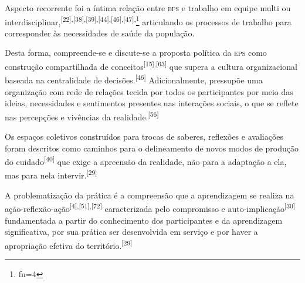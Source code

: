 \documentclass{article}
\makeatletter
\newcommand{\fn}{\afterassignment\fn@aux\count0=}
\newcommand{\fn@aux}{\csname fn\the\count0\endcsname}
\makeatother
\begin{document}
Aspecto recorrente foi a íntima relação entre \textsc{eps} e trabalho em equipe multi ou
interdisciplinar,\textsuperscript{[}\textsuperscript{22}\textsuperscript{]}\textsuperscript{,}\textsuperscript{[}\textsuperscript{38}\textsuperscript{]}\textsuperscript{,}\textsuperscript{[}\textsuperscript{39}\textsuperscript{]}\textsuperscript{,}\textsuperscript{[}\textsuperscript{44}\textsuperscript{]}\textsuperscript{,}\textsuperscript{[}\textsuperscript{46}\textsuperscript{]}\textsuperscript{,}\textsuperscript{[}\textsuperscript{47}\textsuperscript{]}\textsuperscript{,}\footnote{\fn4}
articulando os processos de trabalho para corresponder às necessidades de saúde
da população.

Desta forma, compreende-se e discute-se a proposta política da \textsc{eps} como
construção compartilhada de conceitos\textsuperscript{[}\textsuperscript{15}\textsuperscript{]}\textsuperscript{,}\textsuperscript{[}\textsuperscript{63}\textsuperscript{]}
que supera a cultura organizacional baseada na centralidade de decisões.\textsuperscript{[}\textsuperscript{46}\textsuperscript{]}
Adicionalmente, pressupõe uma organização com rede de relações tecida por todos
os participantes por meio das ideias, necessidades e sentimentos presentes nas
interações sociais, o que se reflete nas percepções e vivências da realidade.\textsuperscript{[}\textsuperscript{56}\textsuperscript{]}

Os espaços coletivos construídos para trocas de saberes, reflexões e avaliações
foram descritos como caminhos para o delineamento de novos modos de produção do
cuidado\textsuperscript{[}\textsuperscript{40}\textsuperscript{]}
que exige a apreensão da realidade, não para a adaptação a ela, mas para nela
intervir.\textsuperscript{[}\textsuperscript{29}\textsuperscript{]}

A problematização da prática é a compreensão que a aprendizagem se realiza na
ação-reflexão-ação\textsuperscript{[}\textsuperscript{4}\textsuperscript{]}\textsuperscript{,}\textsuperscript{[}\textsuperscript{51}\textsuperscript{]}\textsuperscript{,}\textsuperscript{[}\textsuperscript{72}\textsuperscript{]}
caracterizada pelo compromisso e auto-implicação\textsuperscript{[}\textsuperscript{30}\textsuperscript{]}
fundamentada a partir do conhecimento dos participantes e da aprendizagem
significativa, por sua prática ser desenvolvida em serviço e por haver a
apropriação efetiva do território.\textsuperscript{[}\textsuperscript{29}\textsuperscript{]}
\end{document}
